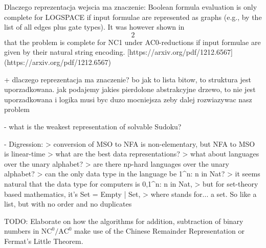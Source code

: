 

Dlaczego reprezentacja wejscia ma znaczenie:  
Boolean formula evaluation is only complete for LOGSPACE if input formulae are represented as graphs  
(e.g., by the list of all edges plus gate types). It was however shown in \[2\] that the problem is complete for  
NC1 under AC0-reductions if input formulae are given by their natural string encoding.  
[https://arxiv.org/pdf/1212.6567](https://arxiv.org/pdf/1212.6567)

+ dlaczego reprezentacja ma znaczenie? bo jak to lista bitow, to struktura jest uporzadkowana. jak podajemy jakies pierdolone abstrakcyjne drzewo, to nie jest uporzadkowana i logika musi byc duzo mocniejsza zeby dalej rozwiazywac nasz problem\!


- what is the weakest representation of solvable Sudoku?

- Digression:
> conversion of MSO to NFA is non-elementary, but NFA to MSO is linear-time  
> what are the best data representations?  
> what about languages over the unary alphabet?  
> are there np-hard languages over the unary alphabet?  
> can the only data type in the language be {1^n: n in Nat}?  
> it seems natural that the data type for computers is { {0,1}^n: n in Nat},  
> but for set-theory based mathematics, it's Set = Empty | {Set},  
> where {} stands for... a set. So like a list, but with no order and no duplicates


\item TODO: Elaborate on how the algorithms for addition, subtraction of binary numbers in $\text{NC}^0/\text{AC}^0$ make use of the Chinese Remainder Representation or Fermat's Little Theorem.